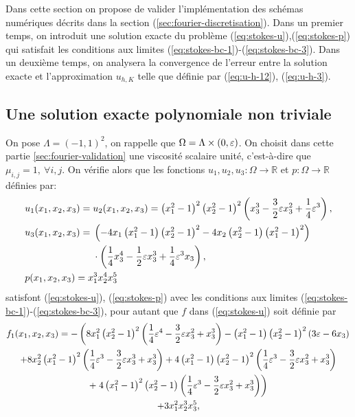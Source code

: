 Dans cette section on propose de valider l'implémentation des schémas
numériques décrits dans la section
(\ref{sec:fourier-discretisation}). Dans un premier temps, on
introduit une solution exacte du problème
(\ref{eq:stokes-u}),(\ref{eq:stokes-p}) qui satisfait les conditions
aux limites (\ref{eq:stokes-bc-1})-(\ref{eq:stokes-bc-3}). Dans un
deuxième temps, on analysera la convergence de l'erreur entre la
solution exacte et l'approximation $u_{h,K}$ telle que définie par
(\ref{eq:u-h-12}), (\ref{eq:u-h-3}).

\subsection{Une solution exacte polynomiale non triviale}
On pose $\Lambda = (-1, 1)^2$, on rappelle que $\Omega =
\Lambda\times(0,\varepsilon)$. On choisit dans cette partie
\ref{sec:fourier-validation} une viscosité scalaire unité,
c'est-à-dire que $\mu_{i,j} = 1,\ \forall i,j$. On vérifie alors que les
fonctions $u_1, u_2, u_3:\Omega\to\mathbb R$ et $p:\Omega\to\mathbb R$
définies par:
\begin{align}
  &u_1(x_1, x_2, x_3) = u_2(x_1, x_2, x_3) = \parent{x_1^2 - 1}^2 %
  \parent{x_2^2 - 1}^2
  \parent{x_3^3 - \frac{3}{2}\thickness x_3^2 + \frac{1}{4}\thickness ^3},\label{eq:stokes-exact-sol-1}\\
  &u_3(x_1, x_2, x_3) = %
  \begin{aligned}[t]
    &\parent{-4x_1\parent{x_1^2 - 1} %
                                   \parent{x_2^2 - 1}^2 %
                              -4x_2\parent{x_2^2 - 1} %
                                   \parent{x_1^2 - 1}^2} \\
    &\cdot\parent{\frac{1}{4}x_3^4 - \frac{1}{2}\thickness x_3^3 + \frac{1}{4}\thickness ^3x_3},
  \end{aligned}\label{eq:stokes-exact-sol-2}\\
  &p(x_1, x_2, x_3) = x_1^3 x_2^4 x_3^5\label{eq:stokes-exact-sol-3}
\end{align}
satisfont (\ref{eq:stokes-u}), (\ref{eq:stokes-p}) avec les
conditions aux limites (\ref{eq:stokes-bc-1})-(\ref{eq:stokes-bc-3}),
pour autant que $f$ dans (\ref{eq:stokes-u}) soit définie par
\begin{multline}
  f_1(x_1, x_2, x_3) =
  -\left(
       8x_1^2
       \left( x_2^2 - 1 \right)^2
       \left( \frac{1}{4}\varepsilon ^4 - \frac{3}{2}\varepsilon x_3^2 + x_3^3 \right)
     - \left( x_1^2 - 1 \right)
       \left( x_2^2 - 1 \right)^2
       \left( 3\varepsilon  - 6x_3 \right)
   \right.\\
  + 8x_2^2
  \left( x_1^2-1 \right)^2
  \left( \frac{1}{4} \varepsilon ^3 - \frac{3}{2}\varepsilon x_3^3 + x_3^3 \right)
  + 4\left( x_1^2 - 1 \right)
     \left( x_2^2 - 1 \right)^2
     \left( \frac{1}{4}\varepsilon ^3 -\frac{3}{2} \varepsilon x_3^2 + x_3^3 \right)\\
    + \left.4\left( x_1^2 - 1 \right)^2\left( x_2^2 - 1 \right)
      \left( \frac{1}{4}\varepsilon ^3 - \frac{3}{2} \varepsilon x_3^2 + x_3^3 \right)\right)\\
    + 3x_1^2 x_2^3x_3^5,
\end{multline}
